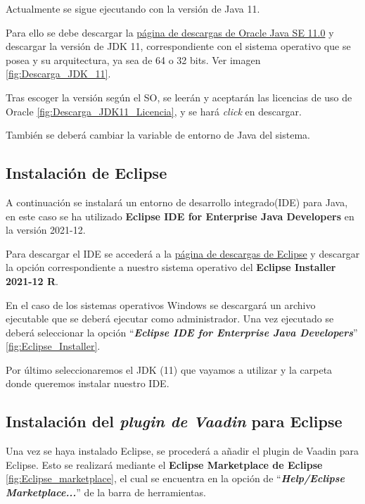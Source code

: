 Actualmente se sigue ejecutando con la versión de Java 11.

Para ello se debe descargar la \href{https://www.oracle.com/es/java/technologies/javase/jdk11-archive-downloads.html}{página de descargas de Oracle Java SE 11.0} y descargar la versión de JDK 11, correspondiente con el sistema operativo que se posea y su arquitectura, ya sea de 64 o 32 bits. Ver imagen \ref{fig:Descarga_JDK_11}.

Tras escoger la versión según el SO, se leerán y aceptarán las licencias de uso de Oracle \ref{fig:Descarga_JDK11_Licencia}, y se hará \emph{click} en descargar.


También se deberá cambiar la variable de entorno de Java del sistema.



\subsection{Instalación de Eclipse}
A continuación se instalará un entorno de desarrollo integrado(IDE) para Java, en este caso se ha utilizado \textbf{Eclipse IDE for Enterprise Java Developers} en la versión 2021-12. 

Para descargar el IDE se accederá a la \href{https://www.eclipse.org/downloads/packages/release/2021-12/r}{página de descargas de Eclipse} y descargar la opción correspondiente a nuestro sistema operativo del \textbf{Eclipse Installer 2021-12 R}. 

En el caso de los sistemas operativos Windows se descargará un archivo ejecutable que se deberá ejecutar como administrador. Una vez ejecutado se deberá seleccionar la opción ``\textbf{\textit{Eclipse IDE for Enterprise Java Developers}}'' \ref{fig:Eclipse_Installer}. 


Por último seleccionaremos el JDK (11) que vayamos a utilizar y la carpeta donde queremos instalar nuestro IDE.

\subsection{Instalación del \textit{plugin de Vaadin} para Eclipse}
Una vez se haya instalado Eclipse, se procederá a añadir el plugin de Vaadin para Eclipse. Esto se realizará mediante el \textbf{Eclipse Marketplace de Eclipse} \ref{fig:Eclipse_marketplace}, el cual se encuentra en la opción de ``\textbf{\textit{Help/Eclipse Marketplace...}}'' de la barra de herramientas.

